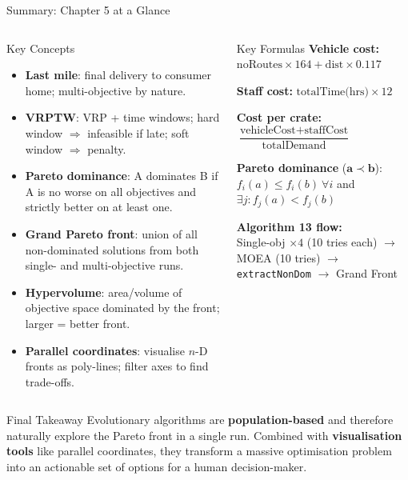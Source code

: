 \documentclass[aspectratio=169,10pt]{beamer}
\begin{document}
\begin{frame}{Summary: Chapter 5 at a Glance}

  \begin{columns}[t]
    \begin{block}{Key Concepts}
      \begin{itemize}
        \item \textbf{Last mile}: final delivery to consumer home;
              multi-objective by nature.
        \item \textbf{VRPTW}: VRP + time windows; hard window
              $\Rightarrow$ infeasible if late; soft window
              $\Rightarrow$ penalty.
        \item \textbf{Pareto dominance}: A dominates B if A is
              no worse on all objectives and strictly better on at
              least one.
        \item \textbf{Grand Pareto front}: union of all non-dominated
              solutions from both single- and multi-objective runs.
        \item \textbf{Hypervolume}: area/volume of objective space
              dominated by the front; larger = better front.
        \item \textbf{Parallel coordinates}: visualise $n$-D fronts
              as poly-lines; filter axes to find trade-offs.
      \end{itemize}
    \end{block}

    \begin{block}{Key Formulas}
      \small
      \textbf{Vehicle cost:}
      $\text{noRoutes} \times 164 + \text{dist} \times 0.117$

      \medskip
      \textbf{Staff cost:}
      $\text{totalTime(hrs)} \times 12$

      \medskip
      \textbf{Cost per crate:}
      $\dfrac{\text{vehicleCost} + \text{staffCost}}{\text{totalDemand}}$

      \medskip
      \textbf{Pareto dominance} ($\mathbf{a} \prec \mathbf{b}$):
      $f_i(a) \leq f_i(b)\ \forall i$ and $\exists j: f_j(a) < f_j(b)$

      \medskip
      \textbf{Algorithm 13 flow:}\\
      Single-obj $\times 4$ (10 tries each)
      $\to$ MOEA (10 tries)
      $\to$ \texttt{extractNonDom}
      $\to$ Grand Front
    \end{block}
  \end{columns}

  \vspace{0.3em}
  \begin{alertblock}{Final Takeaway}
    Evolutionary algorithms are \textbf{population-based} and therefore
    naturally explore the Pareto front in a single run.  Combined with
    \textbf{visualisation tools} like parallel coordinates, they transform
    a massive optimisation problem into an actionable set of options
    for a human decision-maker.
  \end{alertblock}

\end{frame}
\end{document}
